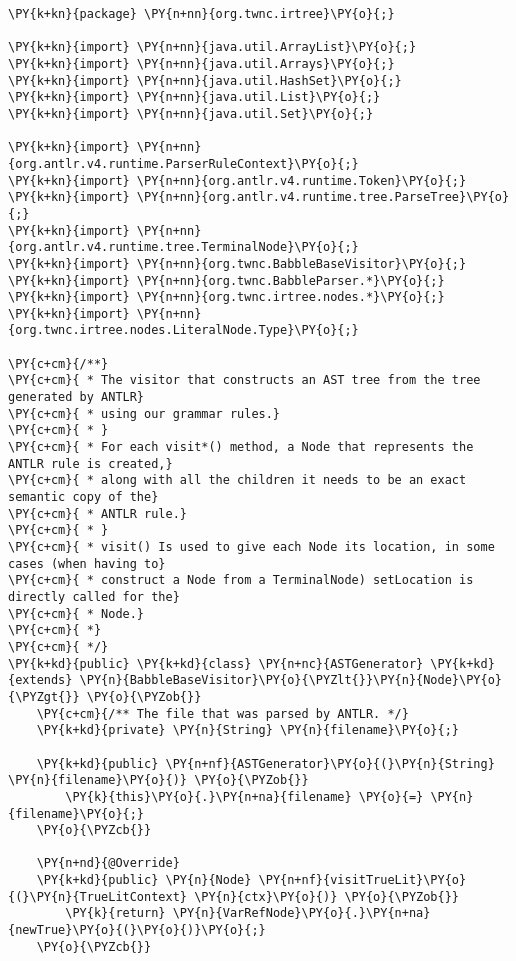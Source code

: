 \begin{Verbatim}[commandchars=\\\{\}]
\PY{k+kn}{package} \PY{n+nn}{org.twnc.irtree}\PY{o}{;}

\PY{k+kn}{import} \PY{n+nn}{java.util.ArrayList}\PY{o}{;}
\PY{k+kn}{import} \PY{n+nn}{java.util.Arrays}\PY{o}{;}
\PY{k+kn}{import} \PY{n+nn}{java.util.HashSet}\PY{o}{;}
\PY{k+kn}{import} \PY{n+nn}{java.util.List}\PY{o}{;}
\PY{k+kn}{import} \PY{n+nn}{java.util.Set}\PY{o}{;}

\PY{k+kn}{import} \PY{n+nn}{org.antlr.v4.runtime.ParserRuleContext}\PY{o}{;}
\PY{k+kn}{import} \PY{n+nn}{org.antlr.v4.runtime.Token}\PY{o}{;}
\PY{k+kn}{import} \PY{n+nn}{org.antlr.v4.runtime.tree.ParseTree}\PY{o}{;}
\PY{k+kn}{import} \PY{n+nn}{org.antlr.v4.runtime.tree.TerminalNode}\PY{o}{;}
\PY{k+kn}{import} \PY{n+nn}{org.twnc.BabbleBaseVisitor}\PY{o}{;}
\PY{k+kn}{import} \PY{n+nn}{org.twnc.BabbleParser.*}\PY{o}{;}
\PY{k+kn}{import} \PY{n+nn}{org.twnc.irtree.nodes.*}\PY{o}{;}
\PY{k+kn}{import} \PY{n+nn}{org.twnc.irtree.nodes.LiteralNode.Type}\PY{o}{;}

\PY{c+cm}{/**}
\PY{c+cm}{ * The visitor that constructs an AST tree from the tree generated by ANTLR}
\PY{c+cm}{ * using our grammar rules.}
\PY{c+cm}{ * }
\PY{c+cm}{ * For each visit*() method, a Node that represents the ANTLR rule is created,}
\PY{c+cm}{ * along with all the children it needs to be an exact semantic copy of the}
\PY{c+cm}{ * ANTLR rule.}
\PY{c+cm}{ * }
\PY{c+cm}{ * visit() Is used to give each Node its location, in some cases (when having to}
\PY{c+cm}{ * construct a Node from a TerminalNode) setLocation is directly called for the}
\PY{c+cm}{ * Node.}
\PY{c+cm}{ *}
\PY{c+cm}{ */}
\PY{k+kd}{public} \PY{k+kd}{class} \PY{n+nc}{ASTGenerator} \PY{k+kd}{extends} \PY{n}{BabbleBaseVisitor}\PY{o}{\PYZlt{}}\PY{n}{Node}\PY{o}{\PYZgt{}} \PY{o}{\PYZob{}}
    \PY{c+cm}{/** The file that was parsed by ANTLR. */}
    \PY{k+kd}{private} \PY{n}{String} \PY{n}{filename}\PY{o}{;}
    
    \PY{k+kd}{public} \PY{n+nf}{ASTGenerator}\PY{o}{(}\PY{n}{String} \PY{n}{filename}\PY{o}{)} \PY{o}{\PYZob{}}
        \PY{k}{this}\PY{o}{.}\PY{n+na}{filename} \PY{o}{=} \PY{n}{filename}\PY{o}{;}
    \PY{o}{\PYZcb{}}
    
    \PY{n+nd}{@Override}
    \PY{k+kd}{public} \PY{n}{Node} \PY{n+nf}{visitTrueLit}\PY{o}{(}\PY{n}{TrueLitContext} \PY{n}{ctx}\PY{o}{)} \PY{o}{\PYZob{}}
        \PY{k}{return} \PY{n}{VarRefNode}\PY{o}{.}\PY{n+na}{newTrue}\PY{o}{(}\PY{o}{)}\PY{o}{;}
    \PY{o}{\PYZcb{}}


\end{Verbatim}
